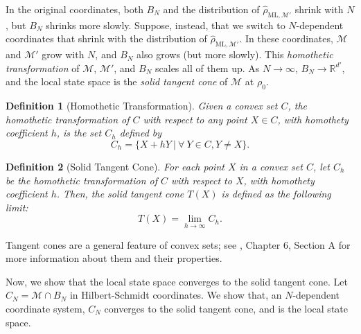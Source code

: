 \documentclass[aps,pra, twocolumn]{revtex4-1}
\newcommand{\M}{\mathcal{M}}
\newcommand{\rhohat}{\hat{\rho}}
\newcommand{\rhoML}[1]{\rhohat_{\scriptscriptstyle{\mathrm{ML},#1}}}
\newtheorem{mydef}{Definition}
\begin{document}
In the original coordinates, both $B_{N}$ and the distribution of $\rhoML{\M'}$ shrink with $N$, but $B_N$ shrinks more slowly.  Suppose, instead, that we switch to $N$-dependent coordinates that shrink with the distribution of $\rhoML{\M'}$.  In these coordinates, $\M$ and $\M'$ grow with $N$, and $B_{N}$ also grows (but more slowly).  This  \emph{homothetic transformation} of $\M$, $\M'$, and $B_{N}$ scales all of them up.  As $N \rightarrow \infty$, $B_{N} \rightarrow \mathbb{R}^{d'}$,  and the local state space is the \emph{solid tangent cone} of $\M$ at $\rho_0$.

\begin{mydef}[Homothetic Transformation] Given a convex set $C$, the homothetic transformation of $C$ with respect to any point $X \in C$, with homothety coefficient $h$, is the set $C_{h}$ defined by
\[C_{h} = \{X + hY~|~\forall~Y\in C, Y \neq X\}.\]
\end{mydef}

\begin{mydef}[Solid Tangent Cone] For each point $X$ in a convex set $C$, let $C_{h}$ be the homothetic transformation of $C$ with respect to $X$, with homothety coefficient $h$. Then, the solid tangent cone $T(X)$ is defined as the following limit:
\[T(X) = \lim_{h\rightarrow \infty} C_{h}.\]
\end{mydef}

Tangent cones are a general feature of convex sets; see \cite{Rockafellar1998}, Chapter 6, Section A for more information about them and their properties.

Now, we show that the local state space converges to the solid tangent cone. Let $C_{N} = \M \cap B_{N}$ in Hilbert-Schmidt coordinates. 
We show that, an $N$-dependent coordinate system, $C_{N}$ converges to the solid tangent cone, and is the local state space.
\end{document}
